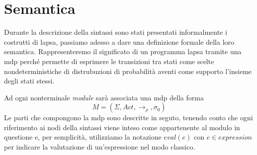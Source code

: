 \section{Semantica}
Durante la descrizione della sintassi sono stati presentati informalmente i costrutti di \ac{lapsa}, passiamo adesso a dare una definizione formale della loro semantica. Rappresenteremo il significato di un programma \ac{lapsa} tramite una \ac{mdp} perché permette di esprimere le transizioni tra stati come scelte nondeterministiche di distrubuzioni di probabilità aventi come supporto l'insieme degli stati stessi.

Ad ogni nonterminale \emph{module} sarà associata una \ac{mdp} della forma
$$ M = (\Sigma,Act,\rightarrow_\rho,\sigma_0) $$
Le parti che compongono la \ac{mdp} sono descritte in seguto, tenendo conto che ogni riferimento ai nodi della sintassi viene inteso come appartenente al modulo in questione e, per semplicità, utilizziamo la notazione $eval(e)$ con $e \in \mathit{expression}$ per indicare la valutazione di un'espressione nel modo classico. 
